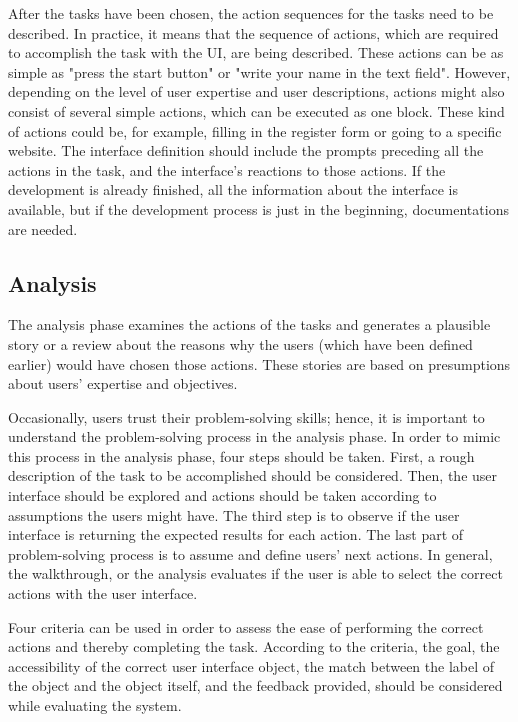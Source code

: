 \documentclass[12pt,a4paper,oneside,pdftex]{report}
\begin{document}
After the tasks have been chosen, the action sequences for the tasks need to be described. In practice, it means that the sequence of actions, which are required to accomplish the task with the UI, are being described. These actions can be as simple as "press the start button" or "write your name in the text field". However, depending on the level of user expertise and user descriptions, actions might also consist of several simple actions, which can be executed as one block. These kind of actions could be, for example, filling in the register form or going to a specific website. The interface definition should include the prompts preceding all the actions in the task, and the interface's reactions to those actions. If the development is already finished, all the information about the interface is available, but if the development process is just in the beginning, documentations are needed. \citep{RefWorks:26}

\subsection{Analysis}

The analysis phase examines the actions of the tasks and generates a plausible story or a review about the reasons why the users (which have been defined earlier) would have chosen those actions. These stories are based on presumptions about users' expertise and objectives. \citep{RefWorks:26}

Occasionally, users trust their problem-solving skills; hence, it is important to understand the problem-solving process in the analysis phase. In order to mimic this process in the analysis phase, four steps should be taken. First, a rough description of the task to be accomplished should be considered. Then, the user interface should be explored and actions should be taken according to assumptions the users might have. The third step is to observe if the user interface is returning the expected results for each action. The last part of problem-solving process is to assume and define users' next actions. \citep{RefWorks:26} In general, the walkthrough, or the analysis evaluates if the user is able to select the correct actions with the user interface.

Four criteria can be used in order to assess the ease of performing the correct actions and thereby completing the task. According to the criteria, the goal, the accessibility of the correct user interface object, the match between the label of the object and the object itself, and the feedback provided, should be considered while evaluating the system. \citep{RefWorks:34}
\end{document}
